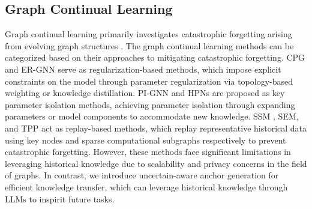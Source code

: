 \documentclass[sigconf]{acmart}
\begin{document}
\subsection{Graph Continual Learning}
Graph continual learning primarily investigates catastrophic forgetting arising from evolving graph structures \cite{GCL}.
The graph continual learning methods can be categorized based on their approaches to mitigating catastrophic forgetting.
CPG \cite{Re} and ER-GNN \cite{Re_2} serve as regularization-based methods, which impose explicit constraints on the model through parameter regularization via topology-based weighting or knowledge distillation.
PI-GNN \cite{is} and HPNs\cite{is_2} are proposed as key parameter isolation methods, achieving parameter isolation through expanding parameters or model components to accommodate new knowledge.
SSM \cite{rh}, SEM\cite{rh_2}, and TPP \cite{TPP} act as replay-based methods, which replay representative historical data using key nodes and sparse computational subgraphs respectively to prevent catastrophic forgetting.
However, these methods face significant limitations in leveraging historical knowledge due to scalability and privacy concerns in the field of graphs.
In contrast, we introduce uncertain-aware anchor generation for efficient knowledge transfer, which can leverage historical knowledge through LLMs to inspirit future tasks.
\end{document}
